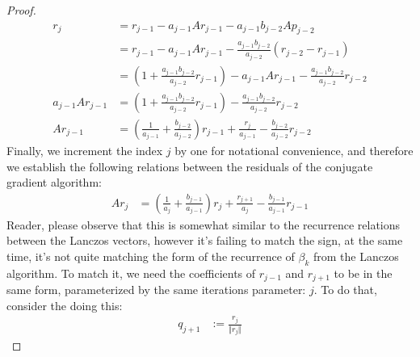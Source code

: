 \documentclass[]{article}
\theoremstyle{definition}
\begin{document}
\begin{appendices}
\begin{proof}
\begin{align}
                        r_{j} &= r_{j - 1} - a_{j - 1}Ar_{j - 1} - a_{j - 1}b_{j - 2}Ap_{j - 2}
                        \\
                        &= 
                        r_{j - 1} - a_{j - 1}Ar_{j - 1} - \frac{a_{j-1}b_{j-2}}{a_{j-2}}\left(
                            r_{j - 2} - r_{j - 1}
                        \right)
                        \\
                        &= \left(
                            1 + \frac{a_{j - 1}b_{j -2}}{a_{j - 2}}r_{j - 1}
                        \right)- a_{j - 1}Ar_{j - 1} - \frac{a_{j-1}b_{j-2}}{a_{j-2}}r_{j - 2}
                        \\
                        a_{j - 1}Ar_{j - 1} &= 
                        \left(
                            1 + \frac{a_{j - 1}b_{j -2}}{a_{j - 2}}r_{j - 1}
                        \right)
                        - \frac{a_{j-1}b_{j-2}}{a_{j-2}}r_{j - 2}
                        \\
                        Ar_{j - 1} &=
                        \left(
                            \frac{1}{a_{j - 1}} + \frac{b_{j - 2}}{a_{j- 2}}
                        \right)r_{j - 1} + 
                        \frac{r_{j}}{a_{j-1}} - 
                        \frac{b_{j - 2}}{a_{j - 2}}r_{j - 2}
                    \end{align}
                    Finally, we increment the index $j$ by one for notational convenience, and therefore we establish the following relations between the residuals of the conjugate gradient algorithm: 
                    \begin{align}
                        Ar_{j} &=
                        \left(
                            \frac{1}{a_{j}} + \frac{b_{j - 1}}{a_{j-  1}}
                        \right)r_{j} + 
                        \frac{r_{j + 1}}{a_{j}} - 
                        \frac{b_{j - 1}}{a_{j - 1}}r_{j - 1}
                    \end{align}
                    Reader, please observe that this is somewhat similar to the recurrence relations between the Lanczos vectors, however it's failing to match the sign, at the same time, it's not quite matching the form of the recurrence of $\beta_k$ from the Lanczos algorithm. To match it, we need the coefficients of $r_{j - 1}$ and $r_{j + 1}$ to be in the same form, parameterized by the same iterations parameter: $j$. To do that, consider the doing this:  
                    \begin{align}
                        q_{j + 1} &:= \frac{r_{j}}{\Vert r_j\Vert}

\end{align}
\end{proof}
\end{appendices}
\end{document}
